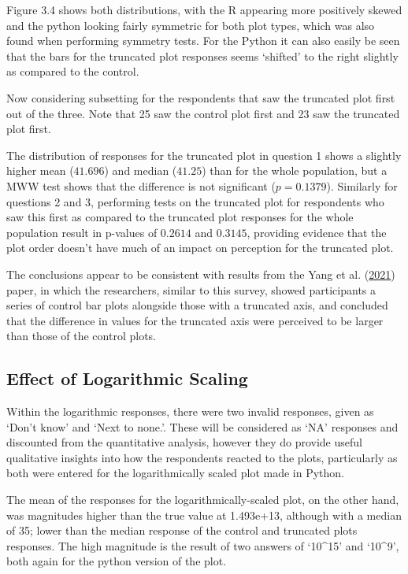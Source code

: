 \documentclass[
  11pt,
]{book}
\begin{document}
Figure 3.4 shows both distributions, with the R appearing more
positively skewed and the python looking fairly symmetric for both plot
types, which was also found when performing symmetry tests. For the
Python it can also easily be seen that the bars for the truncated plot
responses seems `shifted' to the right slightly as compared to the
control.

Now considering subsetting for the respondents that saw the truncated
plot first out of the three. Note that 25 saw the control plot first and
23 saw the truncated plot first.

The distribution of responses for the truncated plot in question 1 shows
a slightly higher mean (\(41.696\)) and median (\(41.25\)) than for the
whole population, but a MWW test shows that the difference is not
significant (\(p=0.1379\)). Similarly for questions 2 and 3, performing
tests on the truncated plot for respondents who saw this first as
compared to the truncated plot responses for the whole population result
in p-values of \(0.2614\) and \(0.3145\), providing evidence that the
plot order doesn't have much of an impact on perception for the
truncated plot.

The conclusions appear to be consistent with results from the Yang et
al. (\protect\hyperlink{ref-YANG2021}{2021}) paper, in which the
researchers, similar to this survey, showed participants a series of
control bar plots alongside those with a truncated axis, and concluded
that the difference in values for the truncated axis were perceived to
be larger than those of the control plots.

\subsection{Effect of Logarithmic Scaling}

Within the logarithmic responses, there were two invalid responses,
given as `Don't know' and `Next to none.'. These will be considered as
`NA' responses and discounted from the quantitative analysis, however
they do provide useful qualitative insights into how the respondents
reacted to the plots, particularly as both were entered for the
logarithmically scaled plot made in Python.

The mean of the responses for the logarithmically-scaled plot, on the
other hand, was magnitudes higher than the true value at 1.493e+13,
although with a median of 35; lower than the median response of the
control and truncated plots responses. The high magnitude is the result
of two answers of `10\^{}15' and `10\^{}9', both again for the python
version of the plot.
\end{document}
